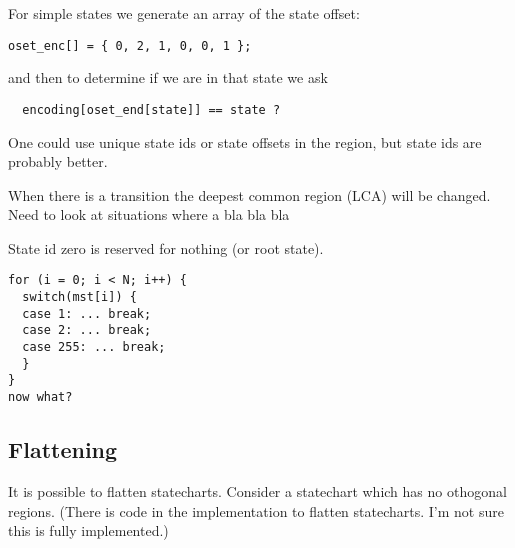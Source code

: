\documentclass{article}
\begin{document}
For simple states we generate an array of the state offset:
\begin{verbatim}
oset_enc[] = { 0, 2, 1, 0, 0, 1 };
\end{verbatim}
and then to determine if we are in that state we ask
\begin{verbatim}
  encoding[oset_end[state]] == state ?
\end{verbatim}

One could use unique state ids or state offsets in the region, but
state ids are probably better.

When there is a transition the deepest common region (LCA) will be changed. 
Need to look at situations where a bla bla bla

State id zero is reserved for nothing (or root state).

\begin{verbatim}
for (i = 0; i < N; i++) {
  switch(mst[i]) {
  case 1: ... break;
  case 2: ... break;
  case 255: ... break;
  }
}
now what?
\end{verbatim}

\subsection{Flattening}

It is possible to flatten statecharts.  Consider a statechart which has
no othogonal regions.  (There is code in the implementation to flatten
statecharts.  I'm not sure this is fully implemented.)
\end{document}
